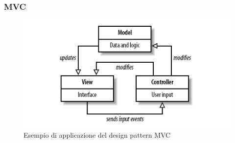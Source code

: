\documentclass{scalatekids-article}
\begin{document}
\subsubsection{MVC}
\begin{figure}[H]
  \begin{center}
    \includegraphics[width=0.9 \textwidth, keepaspectratio]{img/designPattern/mvc.jpg}
    \caption{Esempio di applicazione del design pattern MVC}
  \end{center}
\end{figure}
\end{document}
